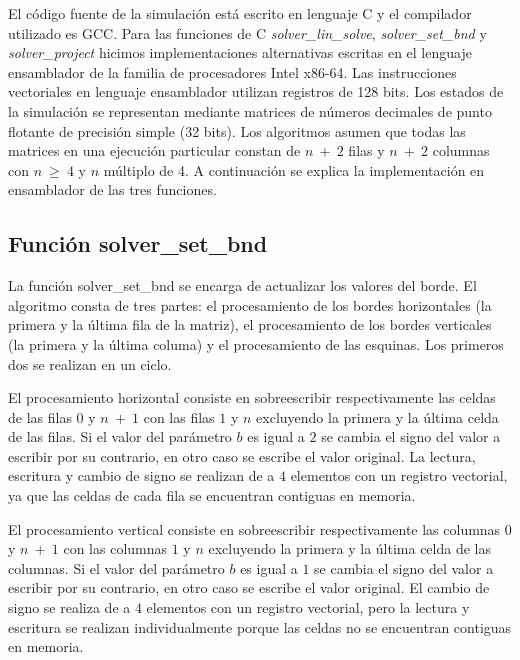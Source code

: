 El código fuente de la simulación está escrito en lenguaje C y el compilador utilizado es GCC. Para las funciones de C \textit{solver\_lin\_solve}, \textit{solver\_set\_bnd} y \textit{solver\_project} hicimos implementaciones alternativas escritas en el lenguaje ensamblador de la familia de procesadores Intel x86-64. Las instrucciones vectoriales en lenguaje ensamblador utilizan registros de 128 bits. Los estados de la simulación se representan mediante matrices de números decimales de punto flotante de precisión simple (32 bits). Los algoritmos asumen que todas las matrices en una ejecución particular constan de $n\ +\ 2$ filas y $n\ +\ 2$ columnas con $n\ \geq\ 4$ y $n$ múltiplo de 4. A continuación se explica la implementación en ensamblador de las tres funciones.

\subsection{Función solver\_set\_bnd}
\par La función solver\_set\_bnd se encarga de actualizar los valores del borde. El algoritmo consta de tres partes: el procesamiento de los bordes horizontales (la primera y la última fila de la matriz), el procesamiento de los bordes verticales (la primera y la última columa) y el procesamiento de las esquinas. Los primeros dos se realizan en un ciclo.\newline
\par El procesamiento horizontal consiste en sobreescribir respectivamente las celdas de las filas $0$ y $n\ +\ 1$ con las filas $1$ y $n$ excluyendo la primera y la última celda de las filas. Si el valor del parámetro $b$ es igual a $2$ se cambia el signo del valor a escribir por su contrario, en otro caso se escribe el valor original. La lectura, escritura y cambio de signo se realizan de a $4$ elementos con un registro vectorial, ya que las celdas de cada fila se encuentran contiguas en memoria.\newline
\par El procesamiento vertical consiste en sobreescribir respectivamente las columnas $0$ y $n\ +\ 1$ con las columnas $1$ y $n$ excluyendo la primera y la última celda de las columnas. Si el valor del parámetro $b$ es igual a $1$ se cambia el signo del valor a escribir por su contrario, en otro caso se escribe el valor original. El cambio de signo se realiza de a $4$ elementos con un registro vectorial, pero la lectura y escritura se realizan individualmente porque las celdas no se encuentran contiguas en memoria.\newline
